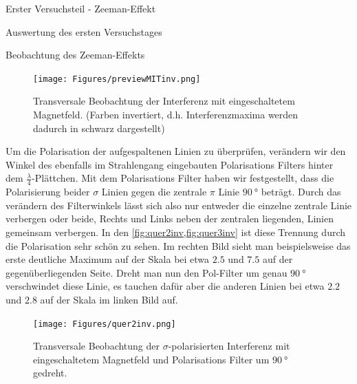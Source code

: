 \documentclass[pdftex, a4paper,11pt, twoside, ngerman]{report}
\begin{document}
\begin{chapter}{Erster Versuchsteil - Zeeman-Effekt}
\begin{section}{Auswertung des ersten Versuchstages}
\begin{subsection}{Beobachtung des Zeeman-Effekts}
\begin{figure}[b!]
\begin{minipage}{0.48\textwidth}
            \caption{Transversale Beobachtung der Interferenz ohne externes 
                Magnetfeld. (Farben invertiert, d.h. Interferenzmaxima werden 
                dadurch in schwarz dargestellt)}
            \label{fig:previewOHNEinv}
          \end{minipage}\quad
          \begin{minipage}{0.48\textwidth}
            \centering
            \texttt{[image: Figures/previewMITinv.png]}
            \caption{Transversale Beobachtung der Interferenz mit 
                eingeschaltetem Magnetfeld. (Farben invertiert, d.h. 
                Interferenzmaxima werden dadurch in schwarz dargestellt)}
            \label{fig:previewMITinv}
          \end{minipage}
        \end{figure}
        \newline
        Um die Polarisation der aufgespaltenen Linien zu überprüfen, verändern
        wir den Winkel des ebenfalls im Strahlengang eingebauten
        Polarisations Filters hinter dem $\frac{\lambda}{4}$-Plättchen. Mit dem
        Polarisations Filter haben wir festgestellt, dass die Polarisierung
        beider $\sigma$ Linien gegen die zentrale $\pi$ Linie $\SI{90}{\degree}$
        beträgt. Durch das verändern des Filterwinkels lässt sich also nur
        entweder die einzelne zentrale Linie verbergen oder beide, Rechts und
        Links neben der zentralen liegenden, Linien gemeinsam verbergen. In den
        \cref{fig:quer2inv,fig:quer3inv} ist diese Trennung durch die
        Polarisation sehr schön zu sehen. Im rechten Bild sieht man
        beispielsweise das erste deutliche Maximum auf der Skala bei etwa $2.5$
        und $7.5$ auf der gegenüberliegenden Seite. Dreht man nun den Pol-Filter
        um genau $\SI{90}{\degree}$ verschwindet diese Linie, es tauchen dafür
        aber die anderen Linien bei etwa $2.2$ und $2.8$ auf der Skala im linken
        Bild auf.
        \begin{figure}[ht]
          \centering
          \begin{minipage}{0.48\textwidth}
            \centering
            \texttt{[image: Figures/quer2inv.png]}
            \caption{Transversale Beobachtung der $\sigma$-polarisierten
                Interferenz mit eingeschaltetem Magnetfeld und Polarisations
                Filter um $\SI{90}{\degree}$ gedreht.}
            \label{fig:quer2inv}
          \end{minipage}\quad
          \begin{minipage}{0.48\textwidth}

\end{minipage}
\end{figure}
\end{subsection}
\end{section}
\end{chapter}
\end{document}
